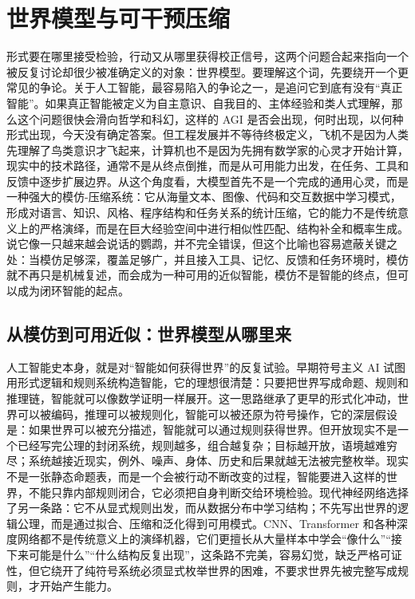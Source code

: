 \section{世界模型与可干预压缩}

形式要在哪里接受检验，行动又从哪里获得校正信号，这两个问题合起来指向一个被反复讨论却很少被准确定义的对象：世界模型。要理解这个词，先要绕开一个更常见的争论。关于人工智能，最容易陷入的争论之一，是追问它到底有没有“真正智能”。如果真正智能被定义为自主意识、自我目的、主体经验和类人式理解，那么这个问题很快会滑向哲学和科幻，这样的 AGI 是否会出现，何时出现，以何种形式出现，今天没有确定答案。但工程发展并不等待终极定义，飞机不是因为人类先理解了鸟类意识才飞起来，计算机也不是因为先拥有数学家的心灵才开始计算，现实中的技术路径，通常不是从终点倒推，而是从可用能力出发，在任务、工具和反馈中逐步扩展边界。从这个角度看，大模型首先不是一个完成的通用心灵，而是一种强大的模仿-压缩系统：它从海量文本、图像、代码和交互数据中学习模式，形成对语言、知识、风格、程序结构和任务关系的统计压缩，它的能力不是传统意义上的严格演绎，而是在巨大经验空间中进行相似性匹配、结构补全和概率生成。说它像一只越来越会说话的鹦鹉，并不完全错误，但这个比喻也容易遮蔽关键之处：当模仿足够深，覆盖足够广，并且接入工具、记忆、反馈和任务环境时，模仿就不再只是机械复述，而会成为一种可用的近似智能，模仿不是智能的终点，但可以成为闭环智能的起点。

\subsection{从模仿到可用近似：世界模型从哪里来}


人工智能史本身，就是对“智能如何获得世界”的反复试验。早期符号主义 AI 试图用形式逻辑和规则系统构造智能，它的理想很清楚：只要把世界写成命题、规则和推理链，智能就可以像数学证明一样展开。这一思路继承了更早的形式化冲动，世界可以被编码，推理可以被规则化，智能可以被还原为符号操作，它的深层假设是：如果世界可以被充分描述，智能就可以通过规则获得世界。但开放现实不是一个已经写完公理的封闭系统，规则越多，组合越复杂；目标越开放，语境越难穷尽；系统越接近现实，例外、噪声、身体、历史和后果就越无法被完整枚举。现实不是一张静态命题表，而是一个会被行动不断改变的过程，智能要进入这样的世界，不能只靠内部规则闭合，它必须把自身判断交给环境检验。现代神经网络选择了另一条路：它不从显式规则出发，而从数据分布中学习结构；不先写出世界的逻辑公理，而是通过拟合、压缩和泛化得到可用模式。CNN、Transformer 和各种深度网络都不是传统意义上的演绎机器，它们更擅长从大量样本中学会“像什么”“接下来可能是什么”“什么结构反复出现”，这条路不完美，容易幻觉，缺乏严格可证性，但它绕开了纯符号系统必须显式枚举世界的困难，不要求世界先被完整写成规则，才开始产生能力。

